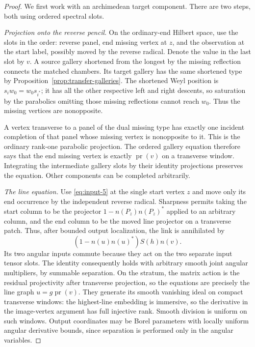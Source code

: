 \begin{proof}
We first work with an archimedean target component. There are two
steps, both using ordered spectral slots.

\emph{Projection onto the reverse pencil.}
On the ordinary-end Hilbert space, use the slots in the order:
reverse panel, end missing vertex at $z$, and the observation at the
start label, possibly moved by the reverse radical. Denote the value
in the last slot by $v$. A source gallery shortened from the longest
by the missing reflection connects the matched chambers. Its target
gallery has the same shortened type by
Proposition~\ref{prop:transfer-galleries}. The shortened Weyl position
is $s_iw_0=w_0s_{i^*}$; it has all the other respective left and right
descents, so saturation by the parabolics omitting those missing
reflections cannot reach $w_0$. Thus the missing vertices are
nonopposite.

A vertex transverse to a panel of the dual missing type has exactly
one incident completion of that panel whose missing vertex is
nonopposite to it. This is the ordinary rank-one parabolic projection.
The ordered gallery equation therefore says that the end missing
vertex is exactly $\operatorname{pr}(v)$ on a transverse window.
Integrating the intermediate gallery slots by their identity
projections preserves the equation. Other components can be completed
arbitrarily.

\emph{The line equation.}
Use \eqref{eq:input-5} at the single start vertex $z$ and move only its
end occurrence by the independent reverse radical. Sharpness permits
taking the start column to be the projector
$1-n(P_z)n(P_z)^*$ applied to an arbitrary column, and the end column
to be the moved line projector on a transverse patch. Thus, after
bounded output localization, the link is annihilated by
\[
 (1-n(u)n(u)^*)S(h)n(v).
\]
Its two angular inputs commute because they act on the two separate
input tensor slots. The identity consequently holds with arbitrary
smooth joint angular multipliers, by summable separation. On the
stratum, the matrix action is the residual projectivity after
transverse projection, so the equations are precisely the line graph
$u=g\operatorname{pr}(v)$. They generate its smooth vanishing ideal
on compact transverse windows: the highest-line embedding is
immersive, so the derivative in the image-vertex argument has full
injective rank. Smooth division is uniform on such windows. Output
coordinates may be Borel parameters with locally uniform angular
derivative bounds, since separation is performed only in the angular
variables.


\end{proof}
